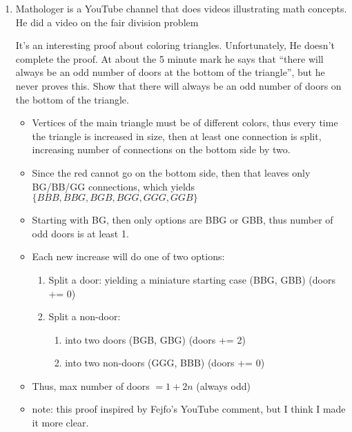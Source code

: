 \documentclass[basic, header]{nosvagor-notes}
\begin{document}
\begin{enumerate}[itemsep=5em]
    \item Mathologer is a YouTube channel that does videos illustrating math
      concepts. He did a video on the fair division problem
      \begin{center}
      \end{center}

      It's an interesting proof about coloring triangles. Unfortunately, He
      doesn't complete the proof. At about the 5 minute mark he says that
      ``there will always be an odd number of doors at the bottom of the
      triangle'',  but he never proves this. Show that there will always be an
      odd number of doors on the bottom of the triangle.

      \begin{itemize}
        \item Vertices of the main triangle must be of different colors, thus every
          time the triangle is increased in size, then at least one connection
          is split, increasing number of connections on the bottom side by two.
        \item Since the red cannot go on the bottom side, then that leaves only
          BG/BB/GG connections, which yields \(\{ BBB, BBG, BGB, BGG, GGG, GGB \}\)
        \item Starting with BG, then only options are BBG or GBB, thus number of odd doors is at least 1.
        \item Each new increase will do one of two options:
          \begin{enumerate}[leftmargin=2em]
            \item Split a door: yielding a miniature starting case (BBG, GBB) (doors += 0)

            \item Split a non-door:
              \begin{enumerate}
                \item into two doors (BGB, GBG) (doors += 2)
                \item into two non-doors (GGG, BBB) (doors += 0)
              \end{enumerate}

          \end{enumerate}
        \item Thus, max number of doors \(= 1 + 2n\) (always odd)

        \item note: this proof inspired by Fejfo's YouTube comment, but I think I
          made it more clear.
      \end{itemize}


\end{enumerate}
\end{document}
